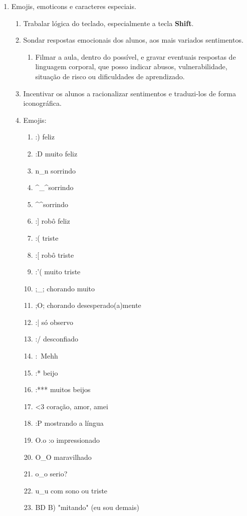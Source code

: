 \begin{enumerate}
	\item Emojis, emoticons e caracteres especiais.
	\begin{enumerate}
		\item Trabalar lógica do teclado, especialmente a tecla \textbf{Shift}.
		\item Sondar respostas emocionais dos alunos, aos mais variados sentimentos.
		\begin{enumerate}
			\item Filmar a aula, dentro do possível, e gravar eventuais respostas de linguagem corporal, que posso indicar abusos, vulnerabilidade, situação de risco ou dificuldades de aprendizado.
		\end{enumerate} 
		\item Incentivar os alunos a racionalizar sentimentos e traduzi-los de forma iconográfica.
		\item Emojis:
		\begin{enumerate}
			\item :) feliz
			\item :D muito feliz
			\item n\_n sorrindo
			\item \textasciicircum\_\textasciicircum sorrindo
			\item
			\textasciicircum\-\textasciicircum \space sorrindo
			\item :] robô feliz
			\item :( triste
			\item :[ robô triste
			\item :'( muito triste
			\item ;\_; chorando muito
			\item ;O; chorando desesperado(a)mente
			\item :| só observo
			\item :/ desconfiado
			\item :\ Mehh
			\item :* beijo
			\item :*** muitos beijos
			\item <3 coração, amor, amei
			\item :P mostrando a língua
			\item O.o :o impressionado
			\item O\_O maravilhado
			\item o\_o serio?
			\item u\_u com sono ou triste
			\item BD B) "mitando" (eu sou demais)

\end{enumerate}
\end{enumerate}
\end{enumerate}

